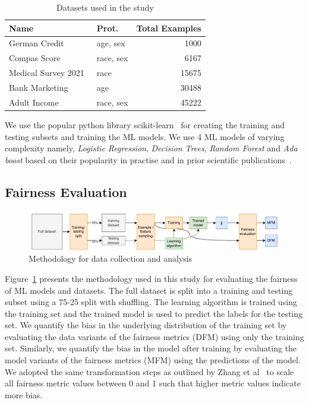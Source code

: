 \documentclass{article}
\begin{document}
\begin{table}
  \centering
  \caption{Datasets used in the study}
  \begin{tabular}{l l r}
    \toprule
    \textbf{Name} & \textbf{Prot.} & \textbf{Total Examples}\\
    \midrule
    German Credit \cite{CITEME} & age, sex & 1000\\
    Compas Score \cite{CITEME} & race, sex & 6167\\
    Medical Survey 2021 \cite{CITEME} & race & 15675\\
    Bank Marketing \cite{CITEME} & age & 30488\\
    Adult Income \cite{CITEME} & race, sex & 45222\\
    \bottomrule
  \end{tabular}
  \label{tab:datasets}
\end{table}

We use the popular python library scikit-learn \cite{sklearn} for
creating the training and testing subsets and training the ML models.
We use 4 ML models of varying complexity namely, \emph{Logistic
Regression}, \emph{Decision Trees}, \emph{Random Forest} and \emph{Ada
boost} based on their popularity in practise and in prior scientific
publications \cite{CITEME}.

\subsection{Fairness Evaluation}\label{sec:method-fair-eval}

\begin{figure}
  \centering
  \includegraphics[width=0.95\linewidth]{method.pdf}
  \caption{Methodology for data collection and analysis}
  \label{fig:method}
\end{figure}

Figure \ref{fig:method} presents the methodology used in this study
for evaluating the fairness of ML models and datasets. The full
dataset is split into a training and testing subset using a 75-25
split with shuffling. The learning algorithm is trained using the
training set and the trained model is used to predict the labels for
the testing set. We quantify the bias in the underlying distribution
of the training set by evaluating the data variants of the fairness
metrics (DFM) using only the training set. Similarly, we quantify the
bias in the model after training by evaluating the model variants of
the fairness metrics (MFM) using the predictions of the model. We
adopted the same transformation steps as outlined by Zhang et
al \cite{zhang2021ignorance} to scale all fairness metric values
between 0 and 1 such that higher metric values indicate more bias.
\end{document}
